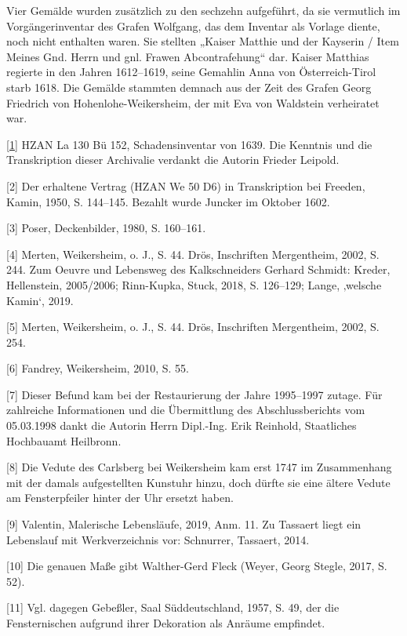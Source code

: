 \documentclass[
  a4paper,
  openany]{book}
\begin{document}
Vier Gemälde wurden zusätzlich zu den sechzehn aufgeführt, da sie
vermutlich im Vorgängerinventar des Grafen Wolfgang, das dem Inventar
als Vorlage diente, noch nicht enthalten waren. Sie stellten „Kaiser
Matthie und der Kayserin / Item Meines Gnd. Herrn und gnl. Frawen
Abcontrafehung`` dar. Kaiser Matthias regierte in den Jahren 1612--1619,
seine Gemahlin Anna von Österreich-Tirol starb 1618. Die Gemälde
stammten demnach aus der Zeit des Grafen Georg Friedrich von
Hohenlohe-Weikersheim, der mit Eva von Waldstein verheiratet war.

\href{https://www.deckenmalerei.eu/edit/451519cf-21f1-45da-b455-d7e7268ed471\#_ftnref1}{{[}1{]}}
HZAN La 130 Bü 152, Schadensinventar von 1639. Die Kenntnis und die
Transkription dieser Archivalie verdankt die Autorin Frieder Leipold.

{[}2{]} Der erhaltene Vertrag (HZAN We 50 D6) in Transkription bei
Freeden, Kamin, 1950, S. 144--145. Bezahlt wurde Juncker im Oktober
1602.

{[}3{]} Poser, Deckenbilder, 1980, S. 160--161.

{[}4{]} Merten, Weikersheim, o. J., S. 44. Drös, Inschriften
Mergentheim, 2002, S. 244. Zum Oeuvre und Lebensweg des Kalkschneiders
Gerhard Schmidt: Kreder, Hellenstein, 2005/2006; Rinn-Kupka, Stuck,
2018, S. 126--129; Lange, ‚welsche Kamin`, 2019.

{[}5{]} Merten, Weikersheim, o. J., S. 44. Drös, Inschriften
Mergentheim, 2002, S. 254.

{[}6{]} Fandrey, Weikersheim, 2010, S. 55.

{[}7{]} Dieser Befund kam bei der Restaurierung der Jahre 1995--1997
zutage. Für zahlreiche Informationen und die Übermittlung des
Abschlussberichts vom 05.03.1998 dankt die Autorin Herrn Dipl.-Ing. Erik
Reinhold, Staatliches Hochbauamt Heilbronn.

{[}8{]} Die Vedute des Carlsberg bei Weikersheim kam erst 1747 im
Zusammenhang mit der damals aufgestellten Kunstuhr hinzu, doch dürfte
sie eine ältere Vedute am Fensterpfeiler hinter der Uhr ersetzt haben.

{[}9{]} Valentin, Malerische Lebensläufe, 2019, Anm. 11. Zu Tassaert
liegt ein Lebenslauf mit Werkverzeichnis vor: Schnurrer, Tassaert, 2014.

{[}10{]} Die genauen Maße gibt Walther-Gerd Fleck (Weyer, Georg Stegle,
2017, S. 52).

{[}11{]} Vgl. dagegen Gebeßler, Saal Süddeutschland, 1957, S. 49, der
die Fensternischen aufgrund ihrer Dekoration als Anräume empfindet.
\end{document}

